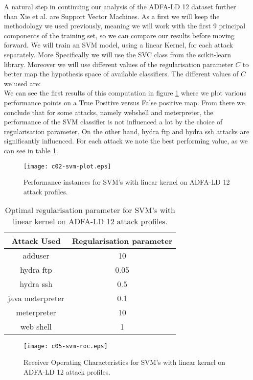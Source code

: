 \documentclass[reqno,openany,12pt]{amsbook}
\newcommand{\beqq}{\begin{equation*}}
\newcommand{\eeqq}{\end{equation*}}
\begin{document}
A natural step in continuing our analysis of the ADFA-LD 12 dataset further than Xie et al.\cite{adf1} are Support Vector Machines. As a first we will keep the methodology we used previously, meaning we will work with the first 9 principal components of the training set, so we can compare our results before moving forward. We will train an SVM model, using a linear Kernel, for each attack separately. More Specifically we will use the SVC class from the scikit-learn library\cite{skl}. Moreover we will use different values of the regularisation parameter $C$ to better map the hypothesis space of available classifiers. The different values of $C$ we used are: 
\beqq
[0.05, 0.1, 0.5, 1, 5, 10, 50]
\eeqq
We can see the first results of this computation in figure \ref{svm-fr1} where we plot various performance points on a True Positive versus False positive map. From there we conclude that for some attacks, namely webshell and meterpreter, the performance of the SVM classifier is not influenced a lot by the choice of  regularisation parameter. On the other hand, hydra ftp and hydra ssh attacks are significantly influenced. For each attack we note the best performing value, as we can see in table \ref{svmt1}.


\begin{figure}
\texttt{[image: c02-svm-plot.eps]}
\caption{Performance instances for SVM's with linear kernel on ADFA-LD 12 attack profiles.}
\label{svm-fr1}
\end{figure}

\begin{table}
\begin{tabular}{|c|c|}
\hline
Attack Used &  Regularisation parameter \\ \hline 
adduser          & 10 \\ \hline
hydra ftp        & 0.05 \\ \hline
hydra ssh        & 0.5 \\ \hline
java meterpreter & 0.1 \\ \hline
meterpreter      & 10 \\ \hline
web shell        & 1 \\ \hline
\end{tabular}
\vspace{5pt}
\caption{Optimal regularisation parameter for SVM's with linear kernel on ADFA-LD 12 attack profiles.}
\label{svmt1}
\end{table}


\begin{figure}
\texttt{[image: c05-svm-roc.eps]}
\caption{Receiver Operating Characteristics for SVM's with linear kernel on ADFA-LD 12 attack profiles.}
\label{svm-fr2}
\end{figure}
\end{document}

